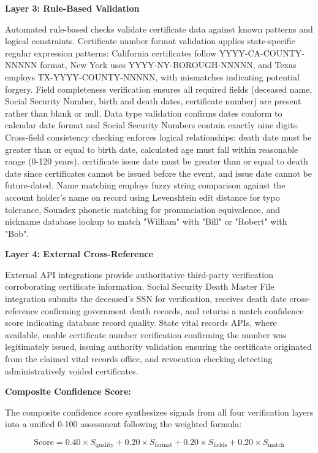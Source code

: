 \textbf{Layer 3: Rule-Based Validation}

Automated rule-based checks validate certificate data against known patterns and logical constraints. Certificate number format validation applies state-specific regular expression patterns: California certificates follow YYYY-CA-COUNTY-NNNNN format, New York uses YYYY-NY-BOROUGH-NNNNN, and Texas employs TX-YYYY-COUNTY-NNNNN, with mismatches indicating potential forgery. Field completeness verification ensures all required fields (deceased name, Social Security Number, birth and death dates, certificate number) are present rather than blank or null. Data type validation confirms dates conform to calendar date format and Social Security Numbers contain exactly nine digits. Cross-field consistency checking enforces logical relationships: death date must be greater than or equal to birth date, calculated age must fall within reasonable range (0-120 years), certificate issue date must be greater than or equal to death date since certificates cannot be issued before the event, and issue date cannot be future-dated. Name matching employs fuzzy string comparison against the account holder's name on record using Levenshtein edit distance for typo tolerance, Soundex phonetic matching for pronunciation equivalence, and nickname database lookup to match "William" with "Bill" or "Robert" with "Bob".

\textbf{Layer 4: External Cross-Reference}

External API integrations provide authoritative third-party verification corroborating certificate information. Social Security Death Master File integration submits the deceased's SSN for verification, receives death date cross-reference confirming government death records, and returns a match confidence score indicating database record quality. State vital records APIs, where available, enable certificate number verification confirming the number was legitimately issued, issuing authority validation ensuring the certificate originated from the claimed vital records office, and revocation checking detecting administratively voided certificates.

\textbf{Composite Confidence Score:}

The composite confidence score synthesizes signals from all four verification layers into a unified 0-100 assessment following the weighted formula:

\begin{equation}
\text{Score} = 0.40 \times S_{\text{quality}} + 0.20 \times S_{\text{format}} + 0.20 \times S_{\text{fields}} + 0.20 \times S_{\text{match}}
\end{equation}

